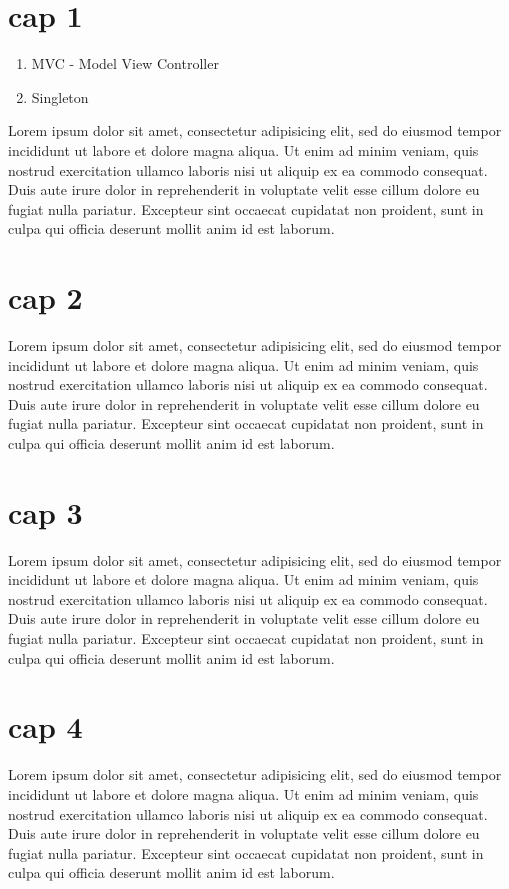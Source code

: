 \documentclass[a4paper,10pt]{report} %
\begin{document}
  \section{cap 1}
		\begin{enumerate}
			\item MVC - Model View Controller
			\item Singleton
			\end{enumerate}

    Lorem ipsum dolor sit amet, consectetur adipisicing elit, sed do eiusmod tempor incididunt ut labore et dolore magna aliqua. Ut enim ad minim veniam, quis nostrud exercitation ullamco laboris nisi ut aliquip ex ea commodo consequat. Duis aute irure dolor in reprehenderit in voluptate velit esse cillum dolore eu fugiat nulla pariatur. Excepteur sint occaecat cupidatat non proident, sunt in culpa qui officia deserunt mollit anim id est laborum.
  \section{cap 2}
    Lorem ipsum dolor sit amet, consectetur adipisicing elit, sed do eiusmod tempor incididunt ut labore et dolore magna aliqua. Ut enim ad minim veniam, quis nostrud exercitation ullamco laboris nisi ut aliquip ex ea commodo consequat. Duis aute irure dolor in reprehenderit in voluptate velit esse cillum dolore eu fugiat nulla pariatur. Excepteur sint occaecat cupidatat non proident, sunt in culpa qui officia deserunt mollit anim id est laborum.
  \section{cap 3}
    Lorem ipsum dolor sit amet, consectetur adipisicing elit, sed do eiusmod tempor incididunt ut labore et dolore magna aliqua. Ut enim ad minim veniam, quis nostrud exercitation ullamco laboris nisi ut aliquip ex ea commodo consequat. Duis aute irure dolor in reprehenderit in voluptate velit esse cillum dolore eu fugiat nulla pariatur. Excepteur sint occaecat cupidatat non proident, sunt in culpa qui officia deserunt mollit anim id est laborum.
  \section{cap 4}
    Lorem ipsum dolor sit amet, consectetur adipisicing elit, sed do eiusmod tempor incididunt ut labore et dolore magna aliqua. Ut enim ad minim veniam, quis nostrud exercitation ullamco laboris nisi ut aliquip ex ea commodo consequat. Duis aute irure dolor in reprehenderit in voluptate velit esse cillum dolore eu fugiat nulla pariatur. Excepteur sint occaecat cupidatat non proident, sunt in culpa qui officia deserunt mollit anim id est laborum.
\newpage
\end{document}
